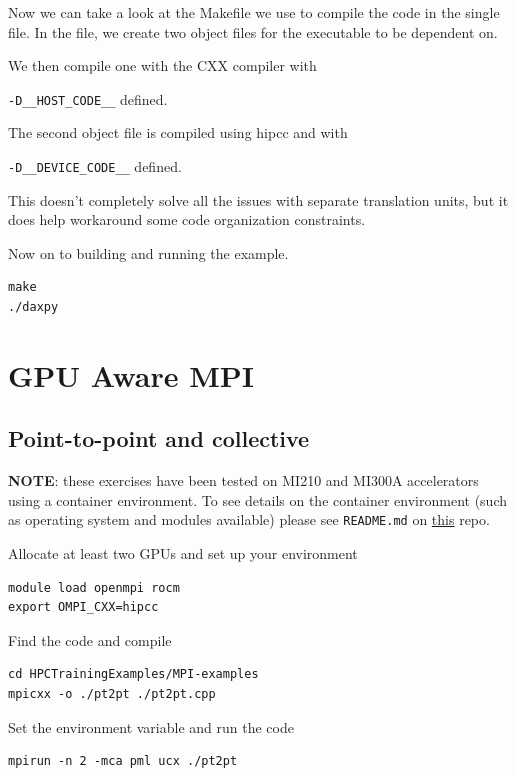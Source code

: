 \documentclass[
]{article}
\let\oldtexttt\texttt
\renewcommand{\texttt}[1]{
  \colorbox{Light}{\oldtexttt{#1}}
}
\begin{document}
Now we can take a look at the Makefile we use to compile the code in the
single file. In the file, we create two object files for the executable
to be dependent on.

We then compile one with the CXX compiler with
\texttt{-D\_\_HOST\_CODE\_\_} defined.

The second object file is compiled using hipcc and with
\texttt{-D\_\_DEVICE\_CODE\_\_} defined.

This doesn't completely solve all the issues with separate translation
units, but it does help workaround some code organization constraints.

Now on to building and running the example.

\begin{verbatim}
make
./daxpy
\end{verbatim}

\pagebreak

\hypertarget{gpu-aware-mpi}{%
\section{GPU Aware MPI}\label{gpu-aware-mpi}}

\hypertarget{point-to-point-and-collective}{%
\subsection{Point-to-point and
collective}\label{point-to-point-and-collective}}

\textbf{NOTE}: these exercises have been tested on MI210 and MI300A
accelerators using a container environment. To see details on the
container environment (such as operating system and modules available)
please see \texttt{README.md} on
\href{https://github.com/amd/HPCTrainingDock}{this} repo.

Allocate at least two GPUs and set up your environment

\begin{verbatim}
module load openmpi rocm
export OMPI_CXX=hipcc
\end{verbatim}

Find the code and compile

\begin{verbatim}
cd HPCTrainingExamples/MPI-examples
mpicxx -o ./pt2pt ./pt2pt.cpp
\end{verbatim}

Set the environment variable and run the code

\begin{verbatim}
mpirun -n 2 -mca pml ucx ./pt2pt
\end{verbatim}
\end{document}
